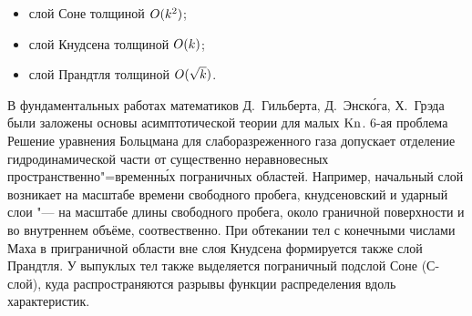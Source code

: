 

\begin{itemize}
    \item слой Соне толщиной \(O(k^2)\);
    \item слой Кнудсена толщиной \(O(k)\);
    \item слой Прандтля толщиной \(O(\sqrt{k})\).
\end{itemize}


В фундаментальных работах математиков Д.~Гильберта, Д.~Энск\'{о}га, Х.~Грэда
были заложены основы асимптотической теории для малых \(\mathrm{Kn}\).
6-ая проблема
Решение уравнения Больцмана для слаборазреженного газа допускает отделение гидродинамической части
от существенно неравновесных пространственно"=временн\'{ы}х пограничных областей.
Например, начальный слой возникает на масштабе времени свободного пробега,
кнудсеновский и ударный слои "--- на масштабе длины свободного пробега,
около граничной поверхности и во внутреннем объёме, соотвественно.
При обтекании тел с конечными числами Маха в приграничной области вне слоя Кнудсена
формируется также слой Прандтля. У выпуклых тел также выделяется пограничный подслой Соне (С-слой),
куда распространяются разрывы функции распределения вдоль характеристик.



